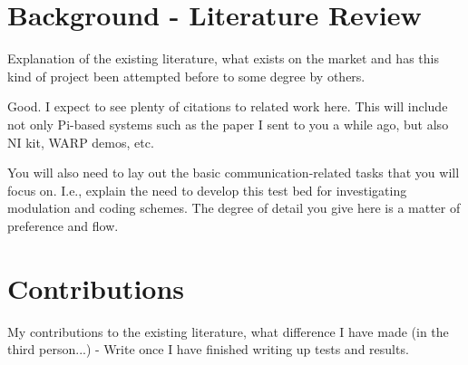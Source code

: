 \documentclass[../main.tex]{subfiles}
\begin{document}

\section{Background - Literature Review} \label{sec_Lit Review}

Explanation of the existing literature, what exists on the market and has this kind of project been attempted before to some degree by others.

Good.  I expect to see plenty of citations to related work here.  This will include not only Pi-based systems such as the paper I sent to you a while ago, but also NI kit, WARP demos, etc.

You will also need to lay out the basic communication-related tasks that you will focus on.  I.e., explain the need to develop this test bed for investigating modulation and coding schemes.  The degree of detail you give here is a matter of preference and flow.



\section{Contributions}

My contributions to the existing literature, what difference I have made (in the third person...) - Write once I have finished writing up tests and results.
\end{document}
